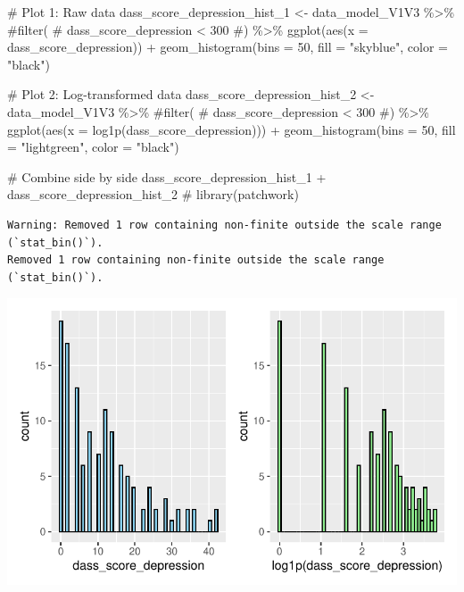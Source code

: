 \documentclass[
  letterpaper,
  DIV=11,
  numbers=noendperiod]{scrartcl}
\newenvironment{Shaded}{\begin{snugshade}}{\end{snugshade}}
\newcommand{\AttributeTok}[1]{\textcolor[rgb]{0.40,0.45,0.13}{#1}}
\newcommand{\CommentTok}[1]{\textcolor[rgb]{0.37,0.37,0.37}{#1}}
\newcommand{\DecValTok}[1]{\textcolor[rgb]{0.68,0.00,0.00}{#1}}
\newcommand{\FunctionTok}[1]{\textcolor[rgb]{0.28,0.35,0.67}{#1}}
\newcommand{\NormalTok}[1]{\textcolor[rgb]{0.00,0.23,0.31}{#1}}
\newcommand{\OtherTok}[1]{\textcolor[rgb]{0.00,0.23,0.31}{#1}}
\newcommand{\SpecialCharTok}[1]{\textcolor[rgb]{0.37,0.37,0.37}{#1}}
\newcommand{\StringTok}[1]{\textcolor[rgb]{0.13,0.47,0.30}{#1}}
\begin{document}
\begin{Shaded}
\begin{Highlighting}[]
\CommentTok{\# Plot 1: Raw data}
\NormalTok{dass\_score\_depression\_hist\_1 }\OtherTok{\textless{}{-}}\NormalTok{ data\_model\_V1V3 }\SpecialCharTok{\%\textgreater{}\%} 
    \CommentTok{\#filter(}
    \CommentTok{\#    dass\_score\_depression \textless{} 300}
    \CommentTok{\#) \%\textgreater{}\% }
    \FunctionTok{ggplot}\NormalTok{(}\FunctionTok{aes}\NormalTok{(}\AttributeTok{x =}\NormalTok{ dass\_score\_depression)) }\SpecialCharTok{+} 
    \FunctionTok{geom\_histogram}\NormalTok{(}\AttributeTok{bins =} \DecValTok{50}\NormalTok{, }\AttributeTok{fill =} \StringTok{"skyblue"}\NormalTok{, }\AttributeTok{color =} \StringTok{"black"}\NormalTok{)}

\CommentTok{\# Plot 2: Log{-}transformed data}
\NormalTok{dass\_score\_depression\_hist\_2 }\OtherTok{\textless{}{-}}\NormalTok{ data\_model\_V1V3 }\SpecialCharTok{\%\textgreater{}\%} 
    \CommentTok{\#filter(}
    \CommentTok{\#    dass\_score\_depression \textless{} 300}
    \CommentTok{\#) \%\textgreater{}\%}
    \FunctionTok{ggplot}\NormalTok{(}\FunctionTok{aes}\NormalTok{(}\AttributeTok{x =} \FunctionTok{log1p}\NormalTok{(dass\_score\_depression))) }\SpecialCharTok{+} 
    \FunctionTok{geom\_histogram}\NormalTok{(}\AttributeTok{bins =} \DecValTok{50}\NormalTok{, }\AttributeTok{fill =} \StringTok{"lightgreen"}\NormalTok{, }\AttributeTok{color =} \StringTok{"black"}\NormalTok{)}

\CommentTok{\# Combine side by side}
\NormalTok{dass\_score\_depression\_hist\_1 }\SpecialCharTok{+}\NormalTok{ dass\_score\_depression\_hist\_2 }\CommentTok{\# library(patchwork)}
\end{Highlighting}
\end{Shaded}

\begin{verbatim}
Warning: Removed 1 row containing non-finite outside the scale range (`stat_bin()`).
Removed 1 row containing non-finite outside the scale range (`stat_bin()`).
\end{verbatim}

\includegraphics{Outcomes_V1V2V3_files/figure-pdf/dass_score_depression_1-1.pdf}
\end{document}

